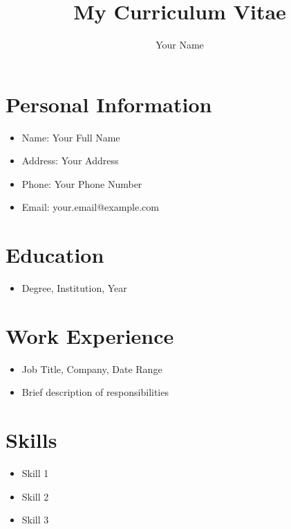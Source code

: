 \documentclass[11pt,a4paper]{article}
\begin{document}
\title{My Curriculum Vitae}
\author{Your Name}
\date{}

\maketitle

\section{Personal Information}
\begin{itemize}
    \item Name: Your Full Name
    \item Address: Your Address
    \item Phone: Your Phone Number
    \item Email: your.email@example.com
\end{itemize}

\section{Education}
\begin{itemize}
    \item Degree, Institution, Year
\end{itemize}

\section{Work Experience}
\begin{itemize}
    \item Job Title, Company, Date Range
    \item Brief description of responsibilities
\end{itemize}

\section{Skills}
\begin{itemize}
    \item Skill 1
    \item Skill 2
    \item Skill 3
\end{itemize}
\end{document}

